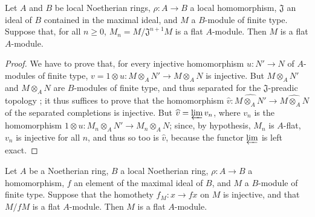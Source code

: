 \begin{proposition}[10.2.6]
\label{0.10.2.6}
Let $A$ and $B$ be local Noetherian rings, $\rho:A\to B$ a local homomorphism, $\mathfrak{J}$ an ideal of $B$ contained in the maximal ideal, and $M$ a $B$-module of finite type.
Suppose that, for all $n\geq0$, $M_n=M/\mathfrak{J}^{n+1}M$ is a flat $A$-module.
Then $M$ is a flat $A$-module.
\end{proposition}

\begin{proof}
We have to prove that, for every injective homomorphism $u:N'\to N$ of $A$-modules of finite type, $v=1\otimes u:M\otimes_A N'\to M\otimes_A N$ is injective.
But $M\otimes_A N'$ and $M\otimes_A N$ are $B$-modules of finite type, and thus separated for the $\mathfrak{J}$-preadic topology ;
it thus suffices to prove that the homomorphism $\widehat{v}:\widehat{M\otimes_A N'}\to\widehat{M\otimes_A N}$ of the separated completions is injective.
But $\widehat{v}=\varprojlim v_n$, where $v_n$ is the homomorphism $1\otimes u:M_n\otimes_A N'\to M_n\otimes_A N$;
since, by hypothesis, $M_n$ is $A$-flat, $v_n$ is injective for all $n$, and thus so too is $\widehat{v}$, because the functor $\varprojlim$ is left exact.
\end{proof}

\begin{corollary}[10.2.7]
\label{0.10.2.7}
Let $A$ be a Noetherian ring, $B$ a local Noetherian ring, $\rho:A\to B$ a homomorphism, $f$ an element of the maximal ideal of $B$, and $M$ a $B$-module of finite type.
Suppose that the homothety $f_M:x\to fx$ on $M$ is injective, and that $M/fM$ is a flat $A$-module.
Then $M$ is a flat $A$-module.
\end{corollary}

